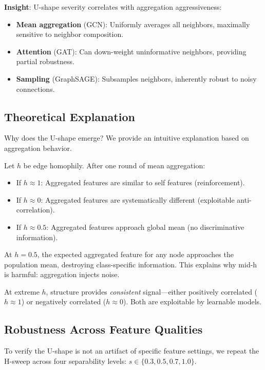 \textbf{Insight}: U-shape severity correlates with aggregation aggressiveness:
\begin{itemize}
    \item \textbf{Mean aggregation} (GCN): Uniformly averages all neighbors, maximally sensitive to neighbor composition.
    \item \textbf{Attention} (GAT): Can down-weight uninformative neighbors, providing partial robustness.
    \item \textbf{Sampling} (GraphSAGE): Subsamples neighbors, inherently robust to noisy connections.
\end{itemize}

\subsection{Theoretical Explanation}

Why does the U-shape emerge? We provide an intuitive explanation based on aggregation behavior.

\begin{proposition}[Informal]
Let $h$ be edge homophily. After one round of mean aggregation:
\begin{itemize}
    \item If $h \approx 1$: Aggregated features are similar to self features (reinforcement).
    \item If $h \approx 0$: Aggregated features are systematically different (exploitable anti-correlation).
    \item If $h \approx 0.5$: Aggregated features approach global mean (no discriminative information).
\end{itemize}
\end{proposition}

At $h = 0.5$, the expected aggregated feature for any node approaches the population mean, destroying class-specific information. This explains why mid-h is harmful: aggregation injects noise.

At extreme $h$, structure provides \textit{consistent} signal---either positively correlated ($h \approx 1$) or negatively correlated ($h \approx 0$). Both are exploitable by learnable models.

\subsection{Robustness Across Feature Qualities}

To verify the U-shape is not an artifact of specific feature settings, we repeat the H-sweep across four separability levels: $s \in \{0.3, 0.5, 0.7, 1.0\}$.

